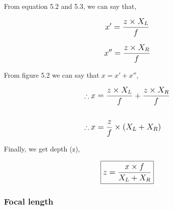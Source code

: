 \documentclass[../../hardware_design_intro/hardware_design_intro.tex]{subfiles}
\begin{document}
From equation 5.2 and 5.3, we can say that,

\begin{equation}
    \text{\large$ x' = \frac{z \times X_{L}}{f} $}
\end{equation}

\begin{equation}
    \text{\large$ x'' = \frac{z \times X_{R}}{f} $}
\end{equation}

From figure 5.2 we can say that \(x = x' + x'' \),

\begin{align*}
    \therefore{}&\text{\large$ x = \frac{z \times X_{L}}{f} + \frac{z \times X_{R}}{f} $}\\\\
    \therefore{}&\text{\large$ x = \frac{z}{f} \times (X_{L} + X_{R}) $}
\end{align*}

Finally, we get depth (z),

\begin{equation}
    \boxed{\text{\large$ z = \frac{x \times f}{X_{L} + X_{R}} $}}
\end{equation}

\subsubsection{Focal length}
\end{document}

